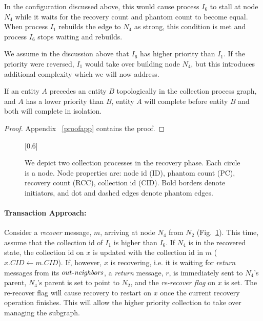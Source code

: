 In the configuration discussed above, this would cause process $I_6$ to stall at
node $N_4$ while it waits for the recovery count and phantom count to become
equal. When process $I_1$ rebuilds the edge to $N_4$ as strong, this condition
is met and process $I_6$ stops waiting and rebuilds.

We assume in the discussion above that $I_6$ has higher priority than $I_1$. If the priority
were reversed, $I_1$ would take over building node $N_4$, but this
introduces additional complexity which we will now address.

\begin{lemma}
If an entity $A$ precedes an entity $B$ topologically in the collection process graph, and
$A$ has a lower priority than $B$, entity $A$ will complete before entity $B$ and both will
complete in isolation.
\label{lem:ordered}
\end{lemma}
\begin{proof}
Appendix ~\ref{proofapp} contains the proof.
\end{proof}

\begin{figure}
\begin{center}
\scalebox{0.6}[0.6]{}
\caption{We depict two collection processes in the recovery phase.
 Each circle is a node.
Node properties are: node id (ID),
phantom count (PC), recovery count (RCC), collection id (CID). Bold borders denote
initiators, and dot and dashed edges denote phantom edges.
}
\label{fig:recoverycount}
\end{center}
\end{figure}

\paragraph{Transaction Approach:}
Consider a \emph{recover} message, $m$, arriving at node $N_4$ from $N_2$ (Fig.~\ref{fig:recoverycount}). This time, assume that the
collection id of $I_1$ is higher than $I_6$. %
If $N_4$ is in the recovered
state, the collection id on $x$ is updated with the collection id in $m$
($x.CID \leftarrow m.CID$).  If, however, $x$ is recovering, i.e.
it is waiting for \emph{return} messages from its $\mathop{\mbox{$out$-$\mathit{neighbors}$}}$, a \emph{return} message, $r$, is immediately sent to $N_4$'s
parent, $N_4$'s parent is set to point to $N_2$, and the
\emph{re-recover flag} on $x$ is set. %
The re-recover flag will cause recovery to restart on $x$ once the
current recovery operation finishes. This will allow the higher priority
collection to take over managing the subgraph.

